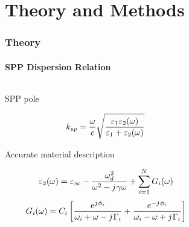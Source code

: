 \documentclass[mathserif,16pt,xcolor=table]{beamer}
\begin{document}
      \section{Theory and Methods}
      \begin{frame}
        \frametitle{Theory}
        \framesubtitle{SPP Dispersion Relation}
        \begin{columns}[T] %
          \begin{column}{.5\textwidth}
            \begin{outline}[itemize]
              \1 SPP pole
            \end{outline}
            \begin{equation} \nonumber
              k_{sp}=\frac{\omega}{c}\sqrt {\dfrac {\varepsilon_{1}\varepsilon_{2}(\omega)} {\varepsilon_{1} + \varepsilon_{2}(\omega)}}
              \label{eq:dis_spp}
            \end{equation}
            \begin{outline}[itemize]
              \1 Accurate material description
            \end{outline}
            \begin{equation} \nonumber
              \varepsilon_2(\omega) = \varepsilon_{\infty} - \frac{\omega_{d}^{2}}{\omega^2 - {j}\mkern1mu\gamma \omega} + \sum \limits_{i = 1}^N G_i(\omega)
              \label{eq:eps_drude_cp}
            \end{equation}
            \begin{equation} \nonumber
              G_i(\omega) = C_i \left[ \frac{e^{{j}\mkern1mu \phi_i}}{\omega_i + \omega - {j}\mkern1mu \Gamma_i} + \frac{e^{-{j}\mkern1mu \phi_i}}{\omega_i - \omega + {j}\mkern1mu \Gamma_i} \right]
              \label{eq:CP_terms}
            \end{equation}
          \end{column}
          \begin{column}[T]{.45\textwidth}
            \vspace*{-2cm}
            \centering
            \begin{figure}

            \end{figure}
          \end{column}
        \end{columns}
      \end{frame}
\end{document}
